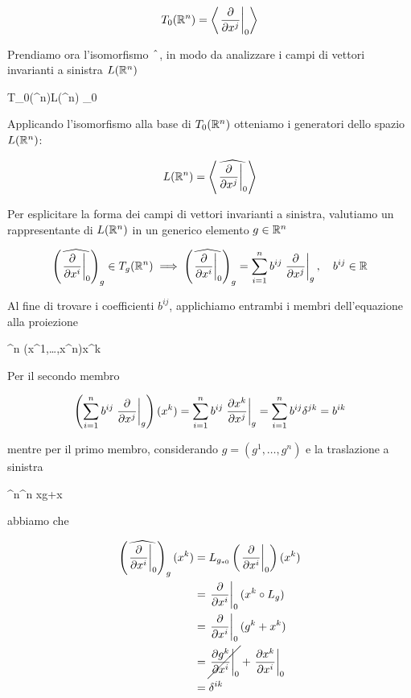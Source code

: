 \begin{equation}
	T_{0}(\R^{n}) = \ev{ \eval{ \pdv{x^{j}} }_{0} }
\end{equation}

Prendiamo ora l'isomorfismo $ \; \hat{} \; $, in modo da analizzare i campi di vettori invarianti a sinistra $ L(\mathbb{R}^{n}) $

\map{\hatapp}
	{T_{0}(\R^{n})}{L(\R^{n})}
	{_{0}}{}

Applicando l'isomorfismo alla base di $ T_{0}(\mathbb{R}^{n}) $ otteniamo i generatori dello spazio $ L(\mathbb{R}^{n}) $:

\begin{equation}
	L(\R^{n}) = \ev{ \widehat{ \eval{ \pdv{x^{j}} }_{0} } }
\end{equation}

Per esplicitare la forma dei campi di vettori invarianti a sinistra, valutiamo un rappresentante di $ L(\mathbb{R}^{n}) $ in un generico elemento $ g \in \mathbb{R}^{n} $

\begin{align}
	\begin{split}
		\left( \widehat{ \eval{ \pdv{x^{i}} }_{0} } \right)_{g} \in T_{g}(\R^{n}) %
		\implies %
		\left( \widehat{ \eval{ \pdv{x^{i}} }_{0} } \right)_{g} = \sum_{i=1}^{n} b^{ij} \eval{ \pdv{x^{j}} }_{g} \qcomma b^{ij} \in \R
	\end{split}
\end{align}

Al fine di trovare i coefficienti $ b^{ij} $, applichiamo entrambi i membri dell'equazione alla proiezione

	{\R^{n}}{\R}
	{(x^{1},\dots,x^{n})}{x^{k}}

Per il secondo membro

\begin{equation}
	\left( \sum_{i=1}^{n} b^{ij} \eval{ \pdv{x^{j}} }_{g} \right) (x^{k}) = \sum_{i=1}^{n} b^{ij} \eval{ \pdv{x^{k}}{x^{j}} }_{g} %
	= \sum_{i=1}^{n} b^{ij} \delta^{jk} %
	= b^{ik}
\end{equation}

mentre per il primo membro, considerando $ g = (g^{1},\dots,g^{n}) $ e la traslazione a sinistra

	{\R^{n}}{\R^{n}}
	{x}{g+x}

abbiamo che

\begin{align}
	\begin{split}
		\left( \widehat{ \eval{ \pdv{x^{i}} }_{0} } \right)_{g} (x^{k}) &= L_{g_{*0}} \left( \eval{ \pdv{x^{i}} }_{0} \right) (x^{k}) \\
		&= \eval{ \pdv{x^{i}} }_{0} (x^{k} \circ L_{g}) \\
		&= \eval{ \pdv{x^{i}} }_{0} (g^{k} + x^{k}) \\
		&= \cancel{ \eval{ \pdv{g^{k}}{x^{i}} }_{0} } + \eval{ \pdv{x^{k}}{x^{i}} }_{0} \\
		&= \delta^{ik}
	\end{split}
\end{align}

